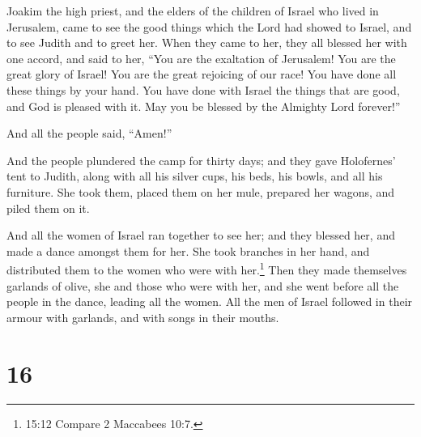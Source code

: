  Joakim the high priest, and the elders of the children of
Israel who lived in Jerusalem, came to see the good things which the
Lord had showed to Israel, and to see Judith and to greet her.
 When they came to her, they all blessed her with one
accord, and said to her, ``You are the exaltation of Jerusalem! You are
the great glory of Israel! You are the great rejoicing of our race!
 You have done all these things by your hand. You have done
with Israel the things that are good, and God is pleased with it. May
you be blessed by the Almighty Lord forever!''

And all the people said, ``Amen!''

 And the people plundered the camp for thirty days; and
they gave Holofernes' tent to Judith, along with all his silver cups,
his beds, his bowls, and all his furniture. She took them, placed them
on her mule, prepared her wagons, and piled them on it.

 And all the women of Israel ran together to see her; and
they blessed her, and made a dance amongst them for her. She took
branches in her hand, and distributed them to the women who were with
her.\footnote{15:12 Compare 2 Maccabees 10:7.}  Then they
made themselves garlands of olive, she and those who were with her, and
she went before all the people in the dance, leading all the women. All
the men of Israel followed in their armour with garlands, and with songs
in their mouths.

\hypertarget{section-15}{%
\section{16}\label{section-15}}

